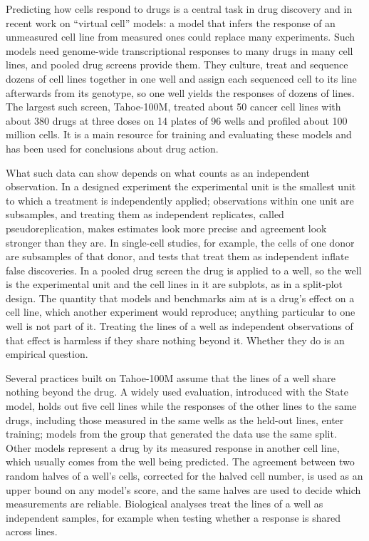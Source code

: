 \documentclass[pdflatex,sn-nature]{sn-jnl}
\begin{document}
Predicting how cells respond to drugs is a central task in drug discovery and in recent work on ``virtual cell'' models: a model that infers the response of an unmeasured cell line from measured ones could replace many experiments\cite{bunne2024,roohani2025}. Such models need genome-wide transcriptional responses to many drugs in many cell lines, and pooled drug screens provide them. They culture, treat and sequence dozens of cell lines together in one well and assign each sequenced cell to its line afterwards from its genotype, so one well yields the responses of dozens of lines\cite{mcfarland2020,zhang2026}. The largest such screen, Tahoe-100M, treated about 50 cancer cell lines with about 380 drugs at three doses on 14 plates of 96 wells and profiled about 100 million cells\cite{zhang2026}. It is a main resource for training and evaluating these models and has been used for conclusions about drug action\cite{zhang2026,shen2026}.

What such data can show depends on what counts as an independent observation. In a designed experiment the experimental unit is the smallest unit to which a treatment is independently applied; observations within one unit are subsamples, and treating them as independent replicates, called pseudoreplication, makes estimates look more precise and agreement look stronger than they are\cite{hurlbert1984}. In single-cell studies, for example, the cells of one donor are subsamples of that donor, and tests that treat them as independent inflate false discoveries\cite{zimmerman2021,squair2021}. In a pooled drug screen the drug is applied to a well, so the well is the experimental unit and the cell lines in it are subplots, as in a split-plot design. The quantity that models and benchmarks aim at is a drug's effect on a cell line, which another experiment would reproduce; anything particular to one well is not part of it. Treating the lines of a well as independent observations of that effect is harmless if they share nothing beyond it. Whether they do is an empirical question.

Several practices built on Tahoe-100M assume that the lines of a well share nothing beyond the drug. A widely used evaluation, introduced with the State model, holds out five cell lines while the responses of the other lines to the same drugs, including those measured in the same wells as the held-out lines, enter training\cite{adduri2025}; models from the group that generated the data use the same split\cite{gandhi2025,rhaister2026}. Other models represent a drug by its measured response in another cell line, which usually comes from the well being predicted\cite{kaufmann2026,molina2026}. The agreement between two random halves of a well's cells, corrected for the halved cell number, is used as an upper bound on any model's score\cite{celleval}, and the same halves are used to decide which measurements are reliable\cite{wang2026}. Biological analyses treat the lines of a well as independent samples, for example when testing whether a response is shared across lines\cite{zhang2026,shen2026}.
\end{document}
